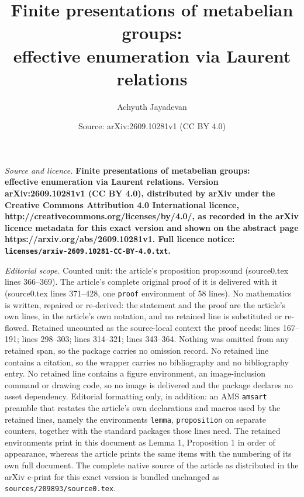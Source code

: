 \documentclass[10pt,a4paper]{amsart}
\title{\bfseries Finite presentations of metabelian groups:\\ effective enumeration via Laurent relations}
\author{Achyuth Jayadevan}
\date{Source: arXiv:2609.10281v1 (CC BY 4.0)}
\begin{document}
\maketitle

\noindent\emph{Source and licence.} \bfseries Finite presentations of metabelian groups:\\ effective enumeration via Laurent relations. Version arXiv:2609.10281v1 (CC BY 4.0), distributed by arXiv under the Creative Commons Attribution 4.0 International licence, http://creativecommons.org/licenses/by/4.0/, as recorded in the arXiv licence metadata for this exact version and shown on the abstract page https://arxiv.org/abs/2609.10281v1. Full licence notice: \texttt{licenses/arxiv-2609.10281-CC-BY-4.0.txt}.\par\smallskip

\noindent\textit{Editorial scope.} Counted unit: the article's proposition prop:sound (source0.tex lines 366--369). The article's complete original proof of it is delivered with it (source0.tex lines 371--428, one \texttt{proof} environment of 58 lines). No mathematics is written, repaired or re-derived: the statement and the proof are the article's own lines, in the article's own notation, and no retained line is substituted or re-flowed.  Retained uncounted as the source-local context the proof needs: lines 167--191; lines 298--303; lines 314--321; lines 343--364.  Nothing was omitted from any retained span, so the package carries no omission record.  No retained line contains a citation, so the wrapper carries no bibliography and no bibliography entry.  No retained line contains a figure environment, an image-inclusion command or drawing code, so no image is delivered and the package declares no asset dependency.  Editorial formatting only, in addition: an AMS \texttt{amsart} preamble that restates the article's own declarations and macros used by the retained lines, namely the environments \texttt{lemma}, \texttt{proposition} on separate counters, together with the standard packages those lines need.  The retained environments print in this document as Lemma 1, Proposition 1 in order of appearance, whereas the article prints the same items with the numbering of its own full document.  The complete native source of the article as distributed in the arXiv e-print for this exact version is bundled unchanged as \texttt{sources/209893/source0.tex}.
\end{document}
